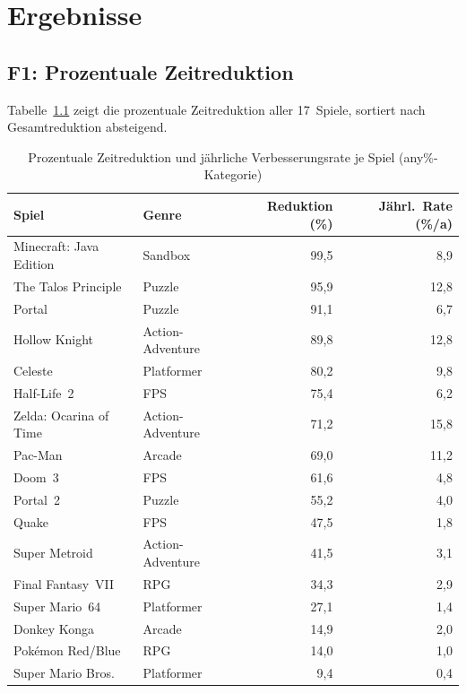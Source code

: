 \chapter{Ergebnisse}
\label{chap:ergebnisse}

\section{F1: Prozentuale Zeitreduktion}

Tabelle~\ref{tab:q1} zeigt die prozentuale Zeitreduktion aller 17~Spiele, sortiert nach Gesamtreduktion absteigend.

\begin{table}[htb]
  \centering
  \caption{Prozentuale Zeitreduktion und jährliche Verbesserungsrate je Spiel (any\%-Kategorie)}
  \label{tab:q1}
  \small
  \begin{tabular}{llrr}
    \toprule
    \textbf{Spiel} & \textbf{Genre} & \textbf{Reduktion (\%)} & \textbf{Jährl.\ Rate (\%/a)} \\
    \midrule
    Minecraft: Java Edition         & Sandbox         & 99,5 & 8,9  \\
    The Talos Principle             & Puzzle          & 95,9 & 12,8 \\
    Portal                          & Puzzle          & 91,1 & 6,7  \\
    Hollow Knight                   & Action-Adventure& 89,8 & 12,8 \\
    Celeste                         & Platformer      & 80,2 & 9,8  \\
    Half-Life~2                     & FPS             & 75,4 & 6,2  \\
    Zelda: Ocarina of Time          & Action-Adventure& 71,2 & 15,8 \\
    Pac-Man                         & Arcade          & 69,0 & 11,2 \\
    Doom~3                          & FPS             & 61,6 & 4,8  \\
    Portal~2                        & Puzzle          & 55,2 & 4,0  \\
    Quake                           & FPS             & 47,5 & 1,8  \\
    Super Metroid                   & Action-Adventure& 41,5 & 3,1  \\
    Final Fantasy~VII               & RPG             & 34,3 & 2,9  \\
    Super Mario~64                  & Platformer      & 27,1 & 1,4  \\
    Donkey Konga                    & Arcade          & 14,9 & 2,0  \\
    Pokémon Red/Blue                & RPG             & 14,0 & 1,0  \\
    Super Mario Bros.               & Platformer      & 9,4  & 0,4  \\
    \bottomrule
  \end{tabular}
\end{table}

